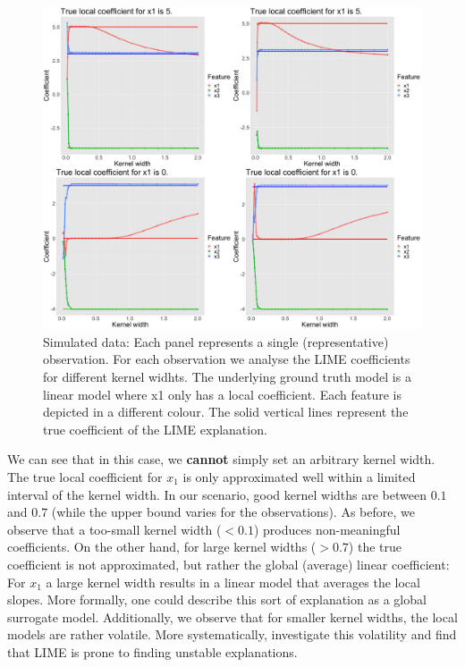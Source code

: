 \documentclass[]{krantz}
\begin{document}
\begin{figure}

{\centering \includegraphics[width=0.99\linewidth]{images/04-09-10} 

}

\caption{Simulated data: Each panel represents a single (representative) observation. For each observation we analyse the LIME coefficients for different kernel widhts. The underlying ground truth model is a linear model where x1 only has a local coefficient. Each feature is depicted in a different colour. The solid vertical lines represent the true coefficient of the LIME explanation.}\label{fig:lime-fig10}
\end{figure}

We can see that in this case, we \textbf{cannot} simply set an arbitrary
kernel width. The true local coefficient for \(x_1\) is only
approximated well within a limited interval of the kernel width. In our
scenario, good kernel widths are between \(0.1\) and \(0.7\) (while the
upper bound varies for the observations). As before, we observe that a
too-small kernel width (\(< 0.1\)) produces non-meaningful coefficients.
On the other hand, for large kernel widths (\(> 0.7\)) the true
coefficient is not approximated, but rather the global (average) linear
coefficient: For \(x_1\) a large kernel width results in a linear model
that averages the local slopes. More formally, one could describe this
sort of explanation as a global surrogate model. Additionally, we
observe that for smaller kernel widths, the local models are rather
volatile. More systematically, \citet{alvarez2018robustness} investigate
this volatility and find that LIME is prone to finding unstable
explanations.
\end{document}
